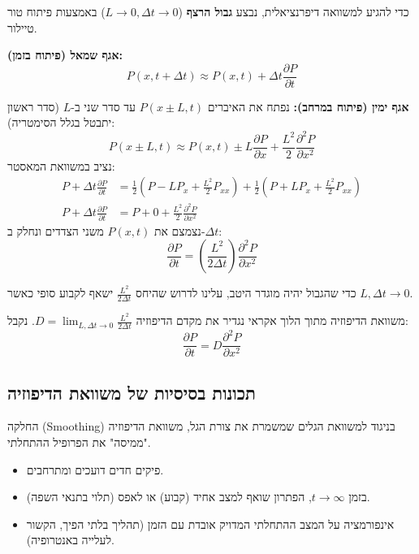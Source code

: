 כדי להגיע למשוואה דיפרנציאלית, נבצע \textbf{גבול הרצף} ($L \to 0, \Delta t \to 0$) באמצעות פיתוח טור טיילור.

\textbf{אגף שמאל (פיתוח בזמן):}
\[
P(x, t+\Delta t) \approx P(x,t) + \Delta t \frac{\partial P}{\partial t}
\]

\textbf{אגף ימין (פיתוח במרחב):}
נפתח את האיברים $P(x\pm L, t)$ עד סדר שני ב-$L$ (סדר ראשון יתבטל בגלל הסימטריה):
\[
P(x\pm L, t) \approx P(x,t) \pm L \frac{\partial P}{\partial x} + \frac{L^2}{2} \frac{\partial^2 P}{\partial x^2}
\]
נציב במשוואת המאסטר:
\begin{align*}
P + \Delta t \frac{\partial P}{\partial t} &= \frac{1}{2}\left( P - L P_x + \frac{L^2}{2} P_{xx} \right) + \frac{1}{2}\left( P + L P_x + \frac{L^2}{2} P_{xx} \right) \\
P + \Delta t \frac{\partial P}{\partial t} &= P + 0 + \frac{L^2}{2} \frac{\partial^2 P}{\partial x^2}
\end{align*}
נצמצם את $P(x,t)$ משני הצדדים ונחלק ב-$\Delta t$:
\[
\frac{\partial P}{\partial t} = \left( \frac{L^2}{2\Delta t} \right) \frac{\partial^2 P}{\partial x^2}
\]

כדי שהגבול יהיה מוגדר היטב, עלינו לדרוש שהיחס $\frac{L^2}{2\Delta t}$ ישאף לקבוע סופי כאשר $L,\Delta t \to 0$.

\begin{resultbox}{משוואת הדיפוזיה מתוך הלוך אקראי}
נגדיר את מקדם הדיפוזיה $D = \lim_{L,\Delta t \to 0} \frac{L^2}{2\Delta t}$. נקבל:
\[
\frac{\partial P}{\partial t} = D \frac{\partial^2 P}{\partial x^2}
\]
\end{resultbox}

\subsection{תכונות בסיסיות של משוואת הדיפוזיה}

\begin{theorembox}{החלקה (Smoothing)}
בניגוד למשוואת הגלים שמשמרת את צורת הגל, משוואת הדיפוזיה "ממיסה" את הפרופיל ההתחלתי.
\begin{itemize}
    \item פיקים חדים דועכים ומתרחבים.
    \item בזמן $t \to \infty$, הפתרון שואף למצב אחיד (קבוע) או לאפס (תלוי בתנאי השפה).
    \item אינפורמציה על המצב ההתחלתי המדויק אובדת עם הזמן (תהליך בלתי הפיך, הקשור לעלייה באנטרופיה).
\end{itemize}
\end{theorembox}

